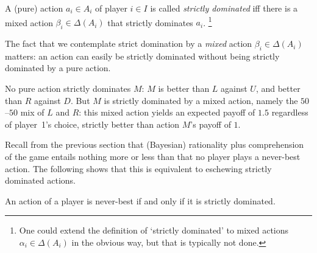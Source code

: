 \begin{definition}
	\label{definition:dominated}
	A (pure) action $a_i \in A_i$ of player $i \in I$ is called \emph{strictly dominated} iff there is a mixed action $\beta_i \in \Delta(A_i)$ that strictly dominates $a_i$.%
		\footnote{One could extend the definition of `strictly dominated' to mixed actions $\alpha_i \in \Delta(A_i)$ in the obvious way, but that is typically not done.}
\end{definition}

The fact that we contemplate strict domination by a \emph{mixed} action $\beta_i \in \Delta(A_i)$ matters: an action can easily be strictly dominated without being strictly dominated by a pure action.

\addtocounter{example}{-2}
\begin{example}
	\label{example:rbty_neverbest_dom}
	No pure action strictly dominates $M$:
	$M$ is better than $L$ against $U$, and better than $R$ against $D$. But $M$ is strictly dominated by a mixed action, namely the $50$--$50$ mix of $L$ and $R$: this mixed action yields an expected payoff of $1.5$ regardless of player~1's choice, strictly better than action $M$'s payoff of $1$.
\end{example}
\addtocounter{example}{1}


Recall from the previous section that (Bayesian) rationality plus comprehension of the game entails nothing more or less than that no player plays a never-best action. The following shows that this is equivalent to eschewing strictly dominated actions.

\begin{namedthm}
	\label{lemma:pearce}
	An action of a player is never-best if and only if it is strictly dominated.
\end{namedthm}

